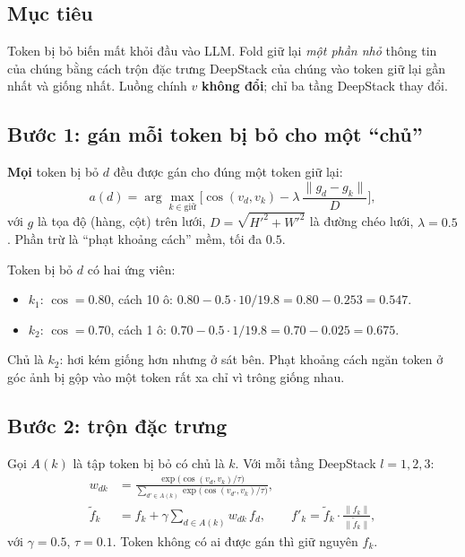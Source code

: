 \documentclass[11pt,a4paper]{article}
\begin{document}
\subsection{Mục tiêu}
Token bị bỏ biến mất khỏi đầu vào LLM. Fold giữ lại \emph{một phần nhỏ} thông tin của chúng bằng cách trộn đặc trưng DeepStack của chúng vào token giữ lại gần nhất và giống nhất. Luồng chính $v$ \textbf{không đổi}; chỉ ba tầng DeepStack thay đổi.

\subsection{Bước 1: gán mỗi token bị bỏ cho một ``chủ''}
\textbf{Mọi} token bị bỏ $d$ đều được gán cho đúng một token giữ lại:
\begin{equation}
a(d)=\arg\max_{k\in\text{giữ}}\Big[\cos(v_d,v_k)-\lambda\,\frac{\|g_d-g_k\|}{D}\Big],
\end{equation}
với $g$ là tọa độ (hàng, cột) trên lưới, $D=\sqrt{H'^2+W'^2}$ là đường chéo lưới, $\lambda=0.5$. Phần trừ là ``phạt khoảng cách'' mềm, tối đa $0.5$.

\begin{vidu}[: chọn chủ trên lưới $14\times14$ ($D=19.8$)]
Token bị bỏ $d$ có hai ứng viên:
\begin{itemize}
\item $k_1$: $\cos=0.80$, cách 10 ô: $0.80-0.5\cdot10/19.8=0.80-0.253=0.547$.
\item $k_2$: $\cos=0.70$, cách 1 ô: $0.70-0.5\cdot1/19.8=0.70-0.025=0.675$.
\end{itemize}
Chủ là $k_2$: hơi kém giống hơn nhưng ở sát bên. Phạt khoảng cách ngăn token ở góc ảnh bị gộp vào một token rất xa chỉ vì trông giống nhau.
\end{vidu}

\subsection{Bước 2: trộn đặc trưng}
Gọi $A(k)$ là tập token bị bỏ có chủ là $k$. Với mỗi tầng DeepStack $l=1,2,3$:
\begin{align}
w_{dk}&=\frac{\exp\big(\cos(v_d,v_k)/\tau\big)}{\sum_{d'\in A(k)}\exp\big(\cos(v_{d'},v_k)/\tau\big)},\\
\tilde f_k&=f_k+\gamma\sum_{d\in A(k)}w_{dk}\,f_d,\qquad f'_k=\tilde f_k\cdot\frac{\|f_k\|}{\|\tilde f_k\|},
\end{align}
với $\gamma=0.5$, $\tau=0.1$. Token không có ai được gán thì giữ nguyên $f_k$.
\end{document}
